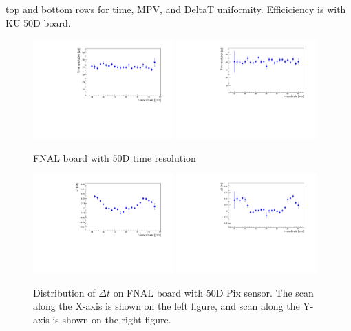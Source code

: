 \documentclass[preprint,1p]{elsarticle}
\begin{document}
 top and bottom rows for time, MPV, and DeltaT uniformity.
Efficiciency is with KU 50D board. 


\begin{figure}[htbp] 
\centering
\includegraphics[width=0.48\textwidth]{figs/FNALBoard_HPK50DPix_Run847-891/TimeResolution_vs_X_Ch4_5.pdf} 
\includegraphics[width=0.48\textwidth]{figs/FNALBoard_HPK50DPix_Run847-891/TimeResolution_vs_Y_Ch3_4.pdf} 
\caption{FNAL board with 50D time resolution} 
\label{fig:Sensors} 
\end{figure} 

\begin{figure}[htbp] 
\centering
\includegraphics[width=0.48\textwidth]{figs/FNALBoard_HPK50DPix_Run847-891/MeanTime_vs_X_Ch4_5.pdf} 
\includegraphics[width=0.48\textwidth]{figs/FNALBoard_HPK50DPix_Run847-891/MeanTime_vs_Y_Ch3_4.pdf} 
\caption{Distribution of $\Delta t$ on FNAL board with 50D Pix sensor. The scan along the X-axis is shown on the left figure, and scan along the Y-axis is shown on the right figure.} 
\label{fig:Sensors} 
\end{figure} 
\end{document}
